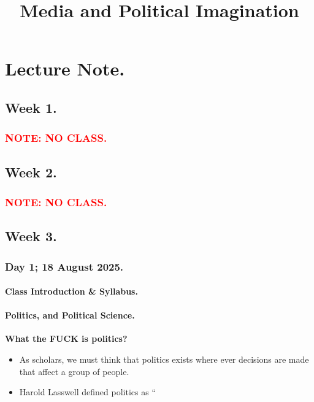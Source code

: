 \documentclass[11pt]{book}
\title{Media and Political Imagination}
\begin{document}
\maketitle
\tableofcontents


\part{Lecture Note.}
	\chapter{Week 1.}
		\section{\textcolor{red}{NOTE: NO CLASS.}}

	\chapter{Week 2.}
		\section{\textcolor{red}{NOTE: NO CLASS.}}

	\chapter{Week 3.}
		\section{Day 1; 18 August 2025.}
			\subsection{Class Introduction \& Syllabus.}
				
				
			\subsection{Politics, and Political Science.}
				
				
				\textbf{What the FUCK is politics?}
				
				\begin{itemize}
					\item As scholars, we must think that politics exists where ever decisions are made that affect a group of people.
					\item Harold Lasswell defined politics as \textquotedblleft
				\end{itemize}
				
\end{document}
